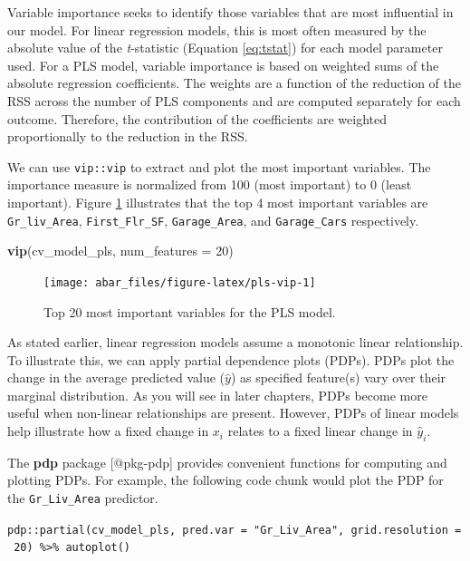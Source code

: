 \documentclass[]{book}
\newenvironment{Shaded}{\begin{snugshade}}{\end{snugshade}}
\newcommand{\DataTypeTok}[1]{\textcolor[rgb]{0.13,0.29,0.53}{#1}}
\newcommand{\DecValTok}[1]{\textcolor[rgb]{0.00,0.00,0.81}{#1}}
\newcommand{\KeywordTok}[1]{\textcolor[rgb]{0.13,0.29,0.53}{\textbf{#1}}}
\newcommand{\NormalTok}[1]{#1}
\theoremstyle{definition}
\theoremstyle{definition}
\theoremstyle{definition}
\theoremstyle{remark}
\begin{document}
Variable importance seeks to identify those variables that are most
influential in our model. For linear regression models, this is most
often measured by the absolute value of the \emph{t}-statistic (Equation
\eqref{eq:tstat}) for each model parameter used. For a PLS model, variable
importance is based on weighted sums of the absolute regression
coefficients. The weights are a function of the reduction of the RSS
across the number of PLS components and are computed separately for each
outcome. Therefore, the contribution of the coefficients are weighted
proportionally to the reduction in the RSS.

We can use \texttt{vip::vip} to extract and plot the most important
variables. The importance measure is normalized from 100 (most
important) to 0 (least important). Figure \ref{fig:pls-vip} illustrates
that the top 4 most important variables are \texttt{Gr\_liv\_Area},
\texttt{First\_Flr\_SF}, \texttt{Garage\_Area}, and
\texttt{Garage\_Cars} respectively.

\begin{Shaded}
\begin{Highlighting}[]
\KeywordTok{vip}\NormalTok{(cv_model_pls, }\DataTypeTok{num_features =} \DecValTok{20}\NormalTok{)}
\end{Highlighting}
\end{Shaded}

\begin{figure}

{\centering \texttt{[image: abar\_files/figure-latex/pls-vip-1]} 

}

\caption{Top 20 most important variables for the PLS model.}\label{fig:pls-vip}
\end{figure}

As stated earlier, linear regression models assume a monotonic linear
relationship. To illustrate this, we can apply partial dependence plots
(PDPs). PDPs plot the change in the average predicted value (\(\hat y\))
as specified feature(s) vary over their marginal distribution. As you
will see in later chapters, PDPs become more useful when non-linear
relationships are present. However, PDPs of linear models help
illustrate how a fixed change in \(x_i\) relates to a fixed linear
change in \(\hat y_i\).

\begin{tip}
The \textbf{pdp} package {[}@pkg-pdp{]} provides convenient functions
for computing and plotting PDPs. For example, the following code chunk
would plot the PDP for the \texttt{Gr\_Liv\_Area} predictor.

\texttt{pdp::partial(cv\_model\_pls,\ pred.var\ =\ "Gr\_Liv\_Area",\ grid.resolution\ =\ 20)\ \%\textgreater{}\%\ autoplot()}
\end{tip}
\end{document}
